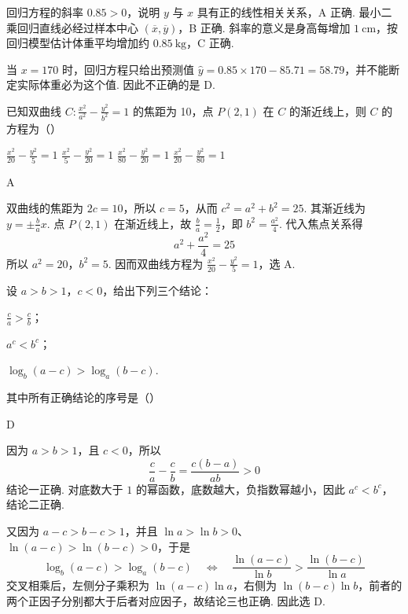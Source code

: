 \begin{solution}
回归方程的斜率 \(0.85>0\)，说明 \(y\) 与 \(x\) 具有正的线性相关关系，A 正确. 最小二乘回归直线必经过样本中心
\((\overline{x},\overline{y})\)，B 正确. 斜率的意义是身高每增加 \(1\mathrm{~cm}\)，按回归模型估计体重平均增加约 \(0.85\mathrm{~kg}\)，C 正确.

当 \(x=170\) 时，回归方程只给出预测值
\(\hat y=0.85\times170-85.71=58.79\)，并不能断定实际体重必为这个值. 因此不正确的是 D.
\end{solution}

\begin{problem}
已知双曲线 \(C: \frac{x^2}{a^2} - \frac{y^2}{b^2} = 1\) 的焦距为 10，点 \(P(2,1)\) 在 \(C\) 的渐近线上，则 \(C\) 的方程为（\quad）

\choices
    {\(\frac{x^2}{20} -\frac{y^2}{5} = 1\)}
    {\(\frac{x^2}{5} -\frac{y^2}{20} = 1\)}
    {\(\frac{x^2}{80} -\frac{y^2}{20} = 1\)}
    {\(\frac{x^2}{20} -\frac{y^2}{80} = 1\)}
\end{problem}

\begin{answer}
A
\end{answer}

\begin{solution}
双曲线的焦距为 \(2c=10\)，所以 \(c=5\)，从而 \(c^2=a^2+b^2=25\). 其渐近线为
\(y=\pm\frac{b}{a}x\). 点 \(P(2,1)\) 在渐近线上，故
\(\frac{b}{a}=\frac12\)，即 \(b^2=\frac{a^2}{4}\). 代入焦点关系得
\[
a^2+\frac{a^2}{4}=25
\]
所以 \(a^2=20\)，\(b^2=5\). 因而双曲线方程为
\(\frac{x^2}{20}-\frac{y^2}{5}=1\)，选 A.
\end{solution}

\begin{problem}
设 \(a > b > 1\)，\(c < 0\)，给出下列三个结论：
\begin{circlelist}
\item \( \frac{c}{a} > \frac{c}{b} \)；
\item \( a^{c} < b^{c} \)；
\item \( \log_{b}(a - c) > \log_{a}(b - c) \).
\end{circlelist}
其中所有正确结论的序号是（\quad）

\choices
    {}
    {}
    {}
    {}
\end{problem}

\begin{answer}
D
\end{answer}

\begin{solution}
因为 \(a>b>1\)，且 \(c<0\)，所以
\[
\frac{c}{a}-\frac{c}{b}=\frac{c(b-a)}{ab}>0
\]
结论一正确. 对底数大于 \(1\) 的幂函数，底数越大，负指数幂越小，因此
\(a^c<b^c\)，结论二正确.

又因为 \(a-c>b-c>1\)，并且 \(\ln a>\ln b>0\)、
\(\ln(a-c)>\ln(b-c)>0\)，于是
\[
\log_b(a-c)>\log_a(b-c)
\quad\Longleftrightarrow\quad
\frac{\ln(a-c)}{\ln b}>\frac{\ln(b-c)}{\ln a}
\]
交叉相乘后，左侧分子乘积为
\(\ln(a-c)\ln a\)，右侧为 \(\ln(b-c)\ln b\)，前者的两个正因子分别都大于后者对应因子，故结论三也正确. 因此选 D.
\end{solution}

